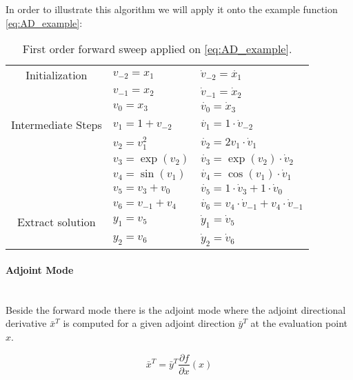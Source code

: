 \documentclass{scrartcl}[12pt, halfparskip]
\begin{document}
In order to illustrate this algorithm we will apply it onto the example function \eqref{eq:AD_example}:

\begin{table}[H]
\centering
\begin{tabular}{| c | l | l |} \hline
	Initialization & $v_{-2} = x_1$ & $\dot{v}_{-2} = \dot{x_1}$ \\
	& $v_{-1} = x_2$ & $\dot{v}_{-1} = \dot{x}_2$ \\
	& $v_{0} = x_3$ & $\dot{v_{0}} = \dot{x}_3$ \\ \hline
	Intermediate Steps & $v_1 = 1+v_{-2}$ & $\dot{v_1} = 1 \cdot \dot{v}_{-2}$ \\
	& $v_2 = v_{1}^2$ & $\dot{v_2} = 2 v_1 \cdot \dot{v}_{1}$ \\
    & $v_3 = \exp(v_{2})$ & $\dot{v_3} = \exp(v_2) \cdot \dot{v}_{2}$ \\
    & $v_4 = \sin(v_{1})$ & $\dot{v_4} = \cos(v_1) \cdot \dot{v}_{1}$ \\
	& $v_{5} = v_3 + v_0$ & $\dot{v_{5}} = 1 \cdot \dot{v}_3 + 1 \cdot \dot{v}_0$ \\
	& $v_{6} = v_{-1} + v_4$ & $\dot{v_{6}} = v_4 \cdot \dot{v}_{-1} + v_4 \cdot \dot{v}_{-1}$ \\ \hline
	Extract  solution & $y_1 = v_5$ & $\dot{y}_1 = \dot{v}_5$ \\
	& $y_2 = v_6$ & $\dot{y}_2 = \dot{v}_6$ \\ \hline
\end{tabular}
\caption{First order forward sweep applied on \eqref{eq:AD_example}.}
\end{table}




\paragraph{Adjoint Mode}\mbox{}\\
Beside the forward mode there is the adjoint mode where the adjoint directional derivative $\bar{x}^T$ is computed for a given adjoint direction $\bar{y}^T$ at the evaluation point $x$. 

\begin{equation}
	\bar{x}^T = \bar{y}^T \frac{\partial f}{\partial x}(x)
\end{equation}
\end{document}

